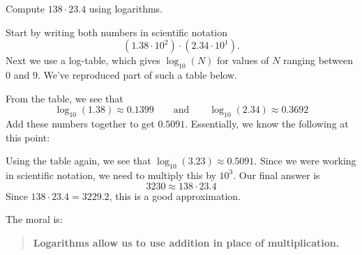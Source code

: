 \documentclass{ximera}
\begin{document}
\begin{example}
  Compute $138\cdot 23.4$ using logarithms.
  \begin{explanation}
    Start by writing both numbers in scientific notation
    \[
    \left(1.38\cdot 10^{2}\right)\cdot \left(2.34 \cdot 10^{1}\right).
    \]
    Next we use a log-table, which gives $\log_{10}(N)$ for values of
    $N$ ranging between $0$ and $9$. We've reproduced part of such a
    table below.
    \begin{image}
    \end{image}
    From the table, we see that 
    \[
    \log_{10}(1.38) \approx 0.1399\qquad\text{and}\qquad \log_{10}(2.34)\approx 0.3692
    \]
    Add these numbers together to get $0.5091$.
    Essentially, we know the following at this point:
    \begin{center}
    \end{center}
    Using the table again, we see that
    $\log_{10}(3.23)\approx 0.5091$. Since we were
    working in scientific notation, we need to multiply this by
    $10^3$. Our final answer is
    \[
    3230 \approx 138\cdot 23.4
    \]
    Since $138\cdot 23.4 = 3229.2$, this is a good approximation.
  \end{explanation}
\end{example}
The moral is:
\begin{quote}
      \textbf{Logarithms allow us to use addition in place of multiplication.}
\end{quote}
\end{document}
